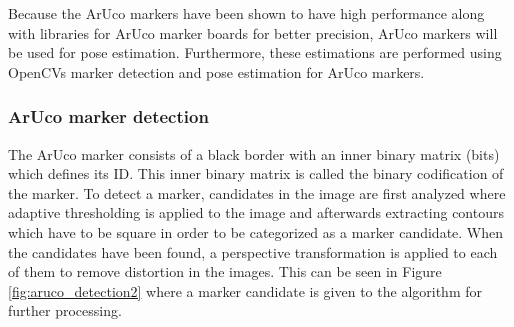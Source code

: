 \documentclass[../Head/report.tex]{subfiles}
\begin{document}
Because the ArUco markers have been shown to have high performance along with libraries for ArUco marker boards for better precision, ArUco markers will be used for pose estimation. Furthermore, these estimations are performed using OpenCVs marker detection and pose estimation for ArUco markers.

\subsubsection{ArUco marker detection}

The ArUco marker consists of a black border with an inner binary matrix (bits) which defines its ID. This inner binary matrix is called the binary codification of the marker. To detect a marker, candidates in the image are first analyzed where adaptive thresholding is applied to the image and afterwards extracting contours which have to be square in order to be categorized as a marker candidate. When the candidates have been found, a perspective transformation is applied to each of them to remove distortion in the images. This can be seen in Figure \ref{fig:aruco_detection2} where a marker candidate is given to the algorithm for further processing.
\end{document}

